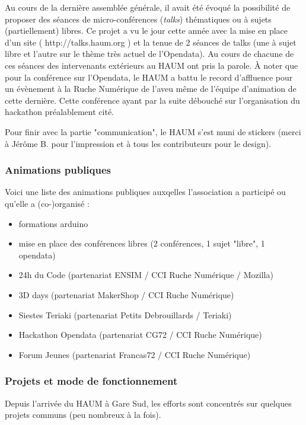\documentclass[a4paper, 11pt]{article}
\begin{document}
Au cours de la dernière assemblée générale, il avait été évoqué la possibilité de proposer des séances de micro-conférences (\textit{talks}) thématiques ou à sujets (partiellement) libres.
Ce projet a vu le jour cette année avec la mise en place d'un site ( http://talks.haum.org ) et la tenue de 2 séances de talks (une à sujet libre et l'autre sur le thème très actuel de l'Opendata).
Au cours de chacune de ces séances des intervenants extérieurs au HAUM ont pris la parole. À noter que pour la conférence sur l'Opendata, le HAUM a battu le record d'affluence pour un évènement à la Ruche Numérique de l'aveu même de l'équipe d'animation de cette dernière. Cette conférence ayant par la suite débouché sur l'organisation du hackathon préalablement cité.

Pour finir avec la partie "communication", le HAUM s'est muni de stickers (merci à Jérôme B. pour l'impression et à tous les contributeurs pour le design).

\subsubsection{Animations publiques}

Voici une liste des animations publiques auxqelles l'association a participé ou qu'elle a (co-)organisé :

\begin{itemize}
    \item formations arduino
    \item mise en place des conférences libres (2 conférences, 1 sujet "libre", 1 opendata)
    \item 24h du Code (partenariat ENSIM / CCI Ruche Numérique / Mozilla)
    \item 3D days (partenariat MakerShop / CCI Ruche Numérique)
    \item Siestes Teriaki (partenariat Petits Debrouillards / Teriaki)
    \item Hackathon Opendata (partenariat CG72 / CCI Ruche Numérique)
    \item Forum Jeunes (partenariat Francas72 / CCI Ruche Numérique)
\end{itemize}

\subsubsection{Projets et mode de fonctionnement}

Depuis l'arrivée du HAUM à Gare Sud, les efforts sont concentrés sur quelques projets communs (peu nombreux à la fois).
\end{document}
